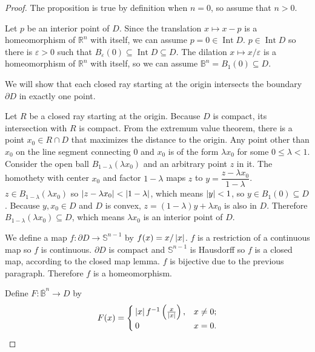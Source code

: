 \begin{proof}
	The proposition is true by definition when $n = 0$, so assume that $n > 0$.

	Let $p$ be an interior point of $D$. Since the translation $x\mapsto x - p$ is a homeomorphism of $\mathbb{R}^{n}$ with itself, we can assume $p = 0 \in \operatorname{Int} D$. $p \in \operatorname{Int} D$ so there is $\varepsilon > 0$ such that $B_{\varepsilon}(0) \subseteq \operatorname{Int} D \subseteq D$. The dilation $x\mapsto x/\varepsilon$ is a homeomorphism of $\mathbb{R}^{n}$ with itself, so we can assume $\mathbb{B}^{n} = B_{1}(0) \subseteq D$.

	We will show that each closed ray starting at the origin intersects the boundary $\partial D$ in exactly one point.

	Let $R$ be a closed ray starting at the origin. Because $D$ is compact, its intersection with $R$ is compact. From the extremum value theorem, there is a point $x_{0} \in R\cap D$ that maximizes the distance to the origin. Any point other than $x_{0}$ on the line segment connecting $0$ and $x_{0}$ is of the form $\lambda x_{0}$ for some $0\leq \lambda < 1$. Consider the open ball $B_{1-\lambda}(\lambda x_{0})$ and an arbitrary point $z$ in it. The homothety with center $x_{0}$ and factor $1 - \lambda$ maps $z$ to $y = \dfrac{z - \lambda x_{0}}{1 - \lambda}$. $z \in B_{1 - \lambda}(\lambda x_{0})$ so $\left\vert{z - \lambda x_{0}}\right\vert < \left\vert{1 - \lambda}\right\vert$, which means $\left\vert{y}\right\vert < 1$, so $y \in B_{1}(0) \subseteq D$. Because $y, x_{0} \in D$ and $D$ is convex, $z = (1 - \lambda)y + \lambda x_{0}$ is also in $D$. Therefore $B_{1 - \lambda}(\lambda x_{0}) \subseteq D$, which means $\lambda x_{0}$ is an interior point of $D$.

	We define a map $f: \partial D \to \mathbb{S}^{n-1}$ by $f(x) = x/\left\vert{x}\right\vert$. $f$ is a restriction of a continuous map so $f$ is continuous. $\partial D$ is compact and $\mathbb{S}^{n-1}$ is Hausdorff so $f$ is a closed map, according to the closed map lemma. $f$ is bijective due to the previous paragraph. Therefore $f$ is a homeomorphism.

	Define $F: \overline{\mathbb{B}}^{n} \to D$ by
	\begin{align*}
		F(x) = \begin{cases}
			       \left\vert{x}\right\vert f^{-1}\left(\frac{x}{\left\vert{x}\right\vert}\right), & x\ne 0; \\
			       0                                             & x = 0.
		       \end{cases}
	\end{align*}


\end{proof}
